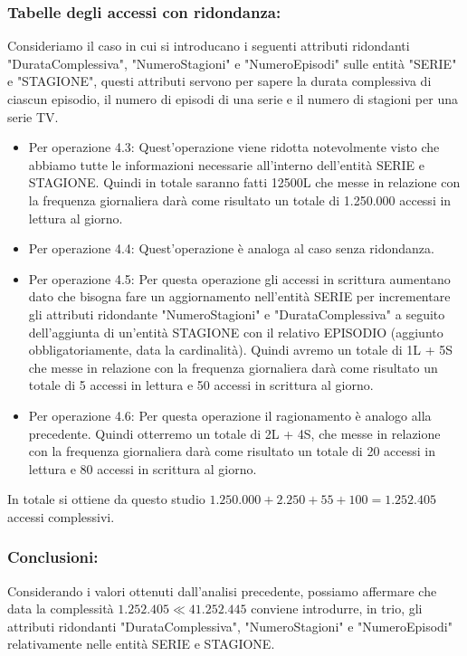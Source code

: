 \documentclass[a4paper,12pt]{report}
\begin{document}
\subsubsection{Tabelle degli accessi con ridondanza:}
Consideriamo il caso in cui si introducano i seguenti attributi ridondanti "DurataComplessiva", "NumeroStagioni" e "NumeroEpisodi" sulle entità "SERIE" e "STAGIONE", questi attributi servono per sapere la durata complessiva di ciascun episodio, il numero di episodi di una serie e il numero di stagioni per una serie TV.
\begin{itemize}
	\item Per operazione 4.3: Quest'operazione viene ridotta notevolmente visto che abbiamo tutte le informazioni necessarie all'interno dell'entità SERIE e STAGIONE. Quindi in totale saranno fatti 12500L che messe in relazione con la frequenza giornaliera darà come risultato un totale di 1.250.000 accessi in lettura al giorno.
	\item Per operazione 4.4: Quest'operazione è analoga al caso senza ridondanza.
	\item Per operazione 4.5: Per questa operazione gli accessi in scrittura aumentano dato che bisogna fare un aggiornamento nell'entità SERIE per incrementare gli attributi ridondante "NumeroStagioni" e "DurataComplessiva" a seguito dell'aggiunta di un'entità STAGIONE con il relativo EPISODIO (aggiunto obbligatoriamente, data la cardinalità). 
	Quindi avremo un totale di 1L + 5S che messe in relazione con la frequenza giornaliera darà come risultato un totale di 5 accessi in lettura e 50 accessi in scrittura al giorno.
	\item Per operazione 4.6: Per questa operazione il ragionamento è analogo alla precedente. Quindi otterremo un totale di 2L + 4S, che messe in relazione con la frequenza giornaliera darà come risultato un totale di 20 accessi in lettura e 80 accessi in scrittura al giorno.
\end{itemize}

In totale si ottiene da questo studio $1.250.000 + 2.250 + 55 + 100 = 1.252.405$ accessi complessivi.
\subsubsection{Conclusioni:}
Considerando i valori ottenuti dall'analisi precedente, possiamo affermare che data la complessità $1.252.405 \ll 41.252.445$ conviene introdurre, in trio, gli attributi ridondanti "DurataComplessiva", "NumeroStagioni" e "NumeroEpisodi" relativamente nelle entità SERIE e STAGIONE.
\end{document}
